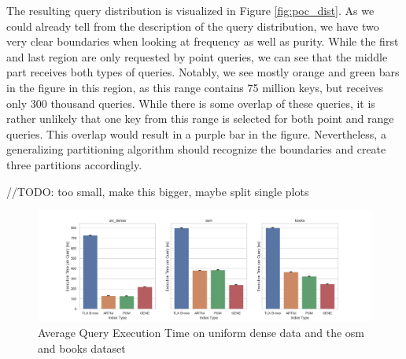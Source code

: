 The resulting query distribution is visualized in Figure \ref{fig:poc_dist}. As we could already tell from the description of the query distribution, we have two very clear boundaries when looking at frequency as well as purity. While the first and last region are only requested by point queries, we can see that the middle part receives both types of queries. Notably, we see mostly orange and green bars in the figure in this region, as this range contains 75 million keys, but receives only 300 thousand queries. While there is some overlap of these queries, it is rather unlikely that one key from this range is selected for both point and range queries. This overlap would result in a purple bar in the figure. Nevertheless, a generalizing partitioning algorithm should recognize the boundaries and create three partitions accordingly.


//TODO: too small, make this bigger, maybe split single plots
\begin{figure}
    \centering
    \includegraphics[width=\textwidth]{figures/poc_times.png}
    \caption{Average Query Execution Time on uniform dense data and the osm and books dataset}
    \label{fig:poc_times}
\end{figure}